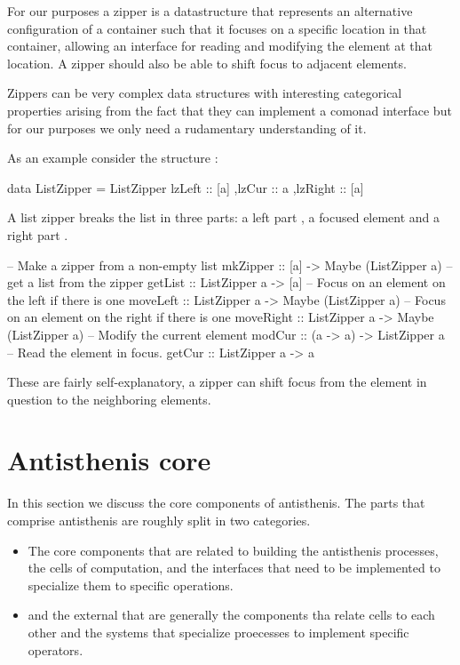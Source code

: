 For our purposes a zipper is a datastructure that represents an
alternative configuration of a container such that it focuses on a
specific location in that container, allowing an interface for reading
and modifying the element at that location. A zipper should also be
able to shift focus to adjacent elements.

Zippers can be very complex data structures with interesting
categorical properties arising from the fact that they can implement a
comonad interface \cite{uustaluComonadicFunctionalAttribute2005} but
for our purposes we only need a rudamentary understanding of it.

As an example consider the structure :

\begin{haskellcode}
data ListZipper =
  ListZipper
  { lzLeft :: [a]
   ,lzCur :: a
   ,lzRight :: [a]
  }
\end{haskellcode}

A list zipper breaks the list in three parts: a left part , a
focused element  and a right part .

\begin{haskellcode}
-- Make a zipper from a non-empty list
mkZipper :: [a] -> Maybe (ListZipper a)
-- get a list from the zipper
getList :: ListZipper a -> [a]
-- Focus on an element on the left if there is one
moveLeft :: ListZipper a -> Maybe (ListZipper a)
-- Focus on an element on the right if there is one
moveRight :: ListZipper a -> Maybe (ListZipper a)
-- Modify the current element
modCur :: (a -> a) -> ListZipper a
-- Read the element in focus.
getCur :: ListZipper a -> a
\end{haskellcode}

These are fairly self-explanatory, a zipper can shift focus from the
element in question to the neighboring elements.

\section{Antisthenis core}

In this section we discuss the core components of antisthenis. The
parts that comprise antisthenis are roughly split in two
categories.

\begin{itemize}
\item The core components that are related to building the antisthenis
processes, the cells of computation, and the interfaces that need to
be implemented to specialize them to specific operations.
\item and the external that are generally the components tha relate cells
to each other and the systems that specialize proecesses to
implement specific operators.
\end{itemize}

